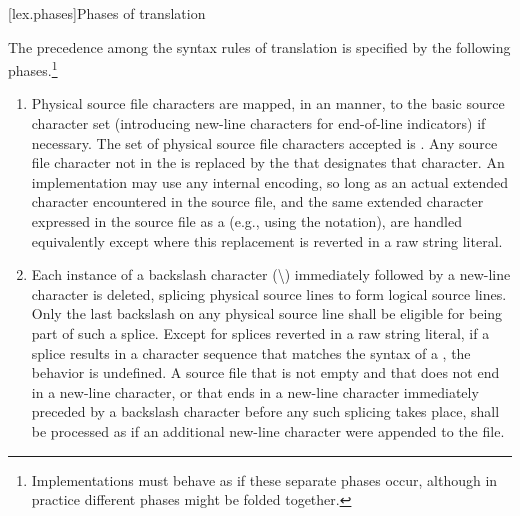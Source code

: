 [lex.phases]{Phases of translation}%

\pnum
{}%
The precedence among the syntax rules of translation is specified by the
following phases.\footnote{Implementations must behave as if these separate phases
occur, although in practice different phases might be folded together.}

\begin{enumerate}
\item
{}%
%
Physical source file characters are mapped, in an
 manner,
to the basic source character set (introducing new-line characters for end-of-line
indicators) if necessary.
The set of physical source file characters accepted is .
Any
source file character not in the
 is replaced by the
 that
designates that character. An implementation may use any internal
encoding, so long as an actual extended character encountered in the
source file, and the same extended character expressed in the source
file as a  (e.g., using the  notation), are handled equivalently
except where this replacement is reverted in a raw string literal.

\item
{}%
Each instance of a backslash character (\textbackslash)
immediately followed by a new-line character is deleted, splicing
physical source lines to form logical source lines. Only the last
backslash on any physical source line shall be eligible for being part
of such a splice.
Except for splices reverted in a raw string literal, if a splice results in
a character sequence that matches the
syntax of a , the behavior is
undefined. A source file that is not empty and that does not end in a new-line
character, or that ends in a new-line character immediately preceded by a
backslash character before any such splicing takes place,
shall be processed as if an additional new-line character were appended
to the file.


\end{enumerate}
